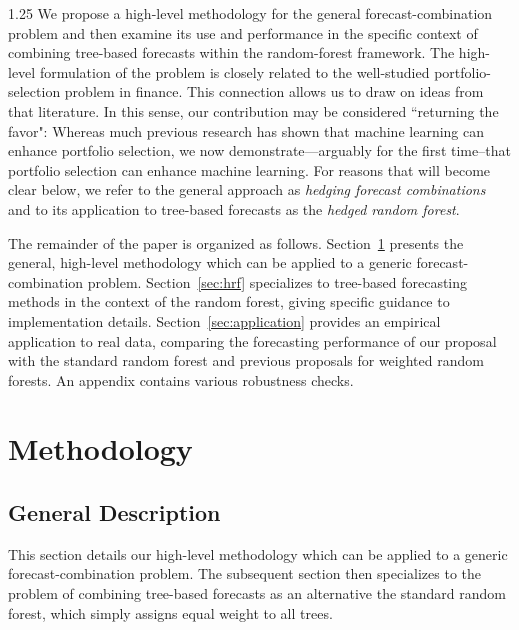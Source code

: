\documentclass[12pt]{article}
\numberwithin{equation}{section}
\theoremstyle{plain}
\begin{document}
\begin{spacing}{1.25}
We propose a high-level methodology for the general forecast-combination problem and then examine its use and performance in the specific context of combining tree-based forecasts within the random-forest framework. The high-level formulation of the problem is closely related to the well-studied portfolio-selection problem in finance. This connection allows us to draw on ideas from that literature. In this sense, our contribution may be considered ``returning the favor": Whereas much previous research has shown that machine learning can enhance portfolio selection, we now demonstrate---arguably for the first time--that portfolio selection can enhance machine learning. For reasons that will become clear below, we refer to the general approach as {\em hedging forecast combinations} and to its application to tree-based forecasts as the {\em hedged random forest}.

The remainder of the paper is organized as follows.
Section~\ref{sec:method} presents the general, high-level methodology
which can be applied to a generic forecast-combination problem.
Section~\ref{sec:hrf} specializes to tree-based forecasting
methods in the context of the random forest,
giving specific guidance to implementation details.
Section~\ref{sec:application}
provides an empirical application to real data,
comparing the forecasting performance of our proposal with the standard
random forest and previous proposals for weighted random forests.
An appendix contains various robustness checks.


\section{Methodology}
\label{sec:method}

\subsection{General Description}
\label{sec:high-level}

This section details our high-level methodology which can
be applied to a generic forecast-combination problem. 
The subsequent section then specializes to the problem of
combining tree-based forecasts as an alternative the standard random
forest, which simply assigns equal weight to all trees.


\end{spacing}
\end{document}
